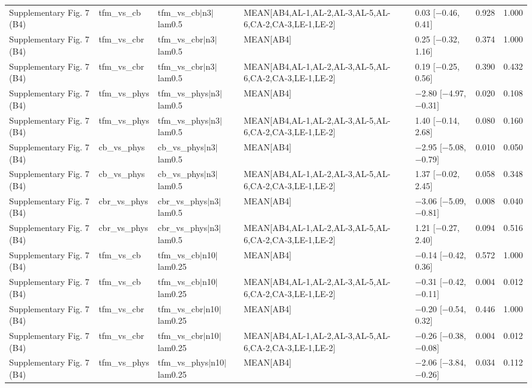 \begin{longtable}{lllllrr}
Supplementary Fig. 7 (B4) & tfm\_vs\_cb & tfm\_vs\_cb$|$n3$|$lam0.5 & MEAN[AB4,AL-1,AL-2,AL-3,AL-5,AL-6,CA-2,CA-3,LE-1,LE-2] & 0.03 [$-$0.46, 0.41] & 0.928 & 1.000 \\
Supplementary Fig. 7 (B4) & tfm\_vs\_cbr & tfm\_vs\_cbr$|$n3$|$lam0.5 & MEAN[AB4] & 0.25 [$-$0.32, 1.16] & 0.374 & 1.000 \\
Supplementary Fig. 7 (B4) & tfm\_vs\_cbr & tfm\_vs\_cbr$|$n3$|$lam0.5 & MEAN[AB4,AL-1,AL-2,AL-3,AL-5,AL-6,CA-2,CA-3,LE-1,LE-2] & 0.19 [$-$0.25, 0.56] & 0.390 & 0.432 \\
Supplementary Fig. 7 (B4) & tfm\_vs\_phys & tfm\_vs\_phys$|$n3$|$lam0.5 & MEAN[AB4] & $-$2.80 [$-$4.97, $-$0.31] & 0.020 & 0.108 \\
Supplementary Fig. 7 (B4) & tfm\_vs\_phys & tfm\_vs\_phys$|$n3$|$lam0.5 & MEAN[AB4,AL-1,AL-2,AL-3,AL-5,AL-6,CA-2,CA-3,LE-1,LE-2] & 1.40 [$-$0.14, 2.68] & 0.080 & 0.160 \\
Supplementary Fig. 7 (B4) & cb\_vs\_phys & cb\_vs\_phys$|$n3$|$lam0.5 & MEAN[AB4] & $-$2.95 [$-$5.08, $-$0.79] & 0.010 & 0.050 \\
Supplementary Fig. 7 (B4) & cb\_vs\_phys & cb\_vs\_phys$|$n3$|$lam0.5 & MEAN[AB4,AL-1,AL-2,AL-3,AL-5,AL-6,CA-2,CA-3,LE-1,LE-2] & 1.37 [$-$0.02, 2.45] & 0.058 & 0.348 \\
Supplementary Fig. 7 (B4) & cbr\_vs\_phys & cbr\_vs\_phys$|$n3$|$lam0.5 & MEAN[AB4] & $-$3.06 [$-$5.09, $-$0.81] & 0.008 & 0.040 \\
Supplementary Fig. 7 (B4) & cbr\_vs\_phys & cbr\_vs\_phys$|$n3$|$lam0.5 & MEAN[AB4,AL-1,AL-2,AL-3,AL-5,AL-6,CA-2,CA-3,LE-1,LE-2] & 1.21 [$-$0.27, 2.40] & 0.094 & 0.516 \\
Supplementary Fig. 7 (B4) & tfm\_vs\_cb & tfm\_vs\_cb$|$n10$|$lam0.25 & MEAN[AB4] & $-$0.14 [$-$0.42, 0.36] & 0.572 & 1.000 \\
Supplementary Fig. 7 (B4) & tfm\_vs\_cb & tfm\_vs\_cb$|$n10$|$lam0.25 & MEAN[AB4,AL-1,AL-2,AL-3,AL-5,AL-6,CA-2,CA-3,LE-1,LE-2] & $-$0.31 [$-$0.42, $-$0.11] & 0.004 & 0.012 \\
Supplementary Fig. 7 (B4) & tfm\_vs\_cbr & tfm\_vs\_cbr$|$n10$|$lam0.25 & MEAN[AB4] & $-$0.20 [$-$0.54, 0.32] & 0.446 & 1.000 \\
Supplementary Fig. 7 (B4) & tfm\_vs\_cbr & tfm\_vs\_cbr$|$n10$|$lam0.25 & MEAN[AB4,AL-1,AL-2,AL-3,AL-5,AL-6,CA-2,CA-3,LE-1,LE-2] & $-$0.26 [$-$0.38, $-$0.08] & 0.004 & 0.012 \\
Supplementary Fig. 7 (B4) & tfm\_vs\_phys & tfm\_vs\_phys$|$n10$|$lam0.25 & MEAN[AB4] & $-$2.06 [$-$3.84, $-$0.26] & 0.034 & 0.112 \\

\end{longtable}
